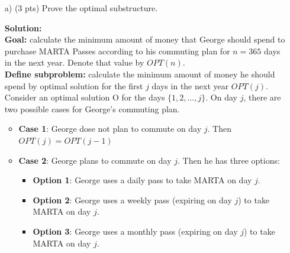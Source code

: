 \documentclass{article}
\begin{document}
\begin{itemize}

\item[a)] (3 pts) Prove the optimal substructure.
\begin{tcolorbox}
\textbf{Solution:} \\
\textbf{Goal:}  calculate the minimum amount of money that George should spend to purchase MARTA Passes according to his commuting plan for $n = 365$ days in the next year. Denote that value by $OPT(n)$. \\
\textbf{Define subproblem:}  calculate the minimum amount of money he should spend by optimal solution for the first $j$ days in the next year $OPT(j)$. \\

Consider an optimal solution O for the days $\{1, 2, ..., j\}$. On day $j$, there are two possible cases for George's commuting plan.
\begin{itemize}
\item \textbf{Case 1}: George dose not plan to commute  on day $j$. Then $OPT(j) = OPT(j-1)$
\item \textbf{Case 2}: George plans to commute on day $j$. Then he has three options:
\begin{itemize}
\item \textbf{Option 1}: George uses a daily pass to take MARTA on day $j$. 
\item \textbf{Option 2}: George uses a weekly pass (expiring on day $j$) to take MARTA on day $j$.
\item \textbf{Option 3}: George uses a monthly pass (expiring on day $j$) to take MARTA on day $j$.
\end{itemize}


\end{itemize}
\end{tcolorbox}
\end{itemize}
\end{document}
